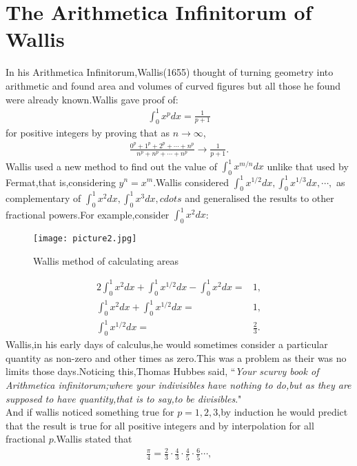 \documentclass[a4paper,reqno,11pt]{book}
\theoremstyle{plain}%
\theoremstyle{definition}
\begin{document}
\section{The Arithmetica Infinitorum of Wallis}
In his Arithmetica Infinitorum,Wallis(1655) thought of turning geometry into arithmetic and found area and volumes of curved figures but all those he found were already known.Wallis gave proof of:
\begin{eqnarray*}
    \int_{0}^{1}x^pdx=\frac{1}{p+1}
\end{eqnarray*}
for positive integers by proving that as $n\longrightarrow\infty$,
\begin{align*}
    \frac{0^p+1^p+2^p+\cdots+n^p}{n^p+n^p+\cdots+n^p}\longrightarrow\frac{1}{p+1}.
\end{align*}
Wallis used a new method to find out the value of $\int_{0}^{1}x^{m/n}dx$ unlike that used by Fermat,that is,considering $y^n=x^m$.Wallis considered $\int_{0}^{1}x^{1/2}dx,\int_{0}^{1}x^{1/3}dx,\cdots,$ as complementary of $\int_{0}^{1}x^2dx,\int_{0}^{1}x^3dx,cdots$ and generalised the results to other fractional powers.For example,consider $\int_{0}^{1}x^2dx$:
\begin{figure}[h]
    \centering
    \texttt{[image: picture2.jpg]}
    \caption{Wallis method of calculating areas}
    \label{fig:picture2}
\end{figure}
\begin{align*}
    2\int_{0}^{1}x^2dx+\int_{0}^{1}x^{1/2}dx-\int_{0}^{1}x^2dx=&1,\\
     \int_{0}^{1}x^2dx+\int_{0}^{1}x^{1/2}dx=&1,\\
     \int_{0}^{1}x^{1/2}dx=&\frac{2}{3}.
\end{align*}
Wallis,in his early days of calculus,he would sometimes consider a particular quantity as non-zero and other times as zero.This was a problem as their was no limits those days.Noticing this,Thomas Hubbes said, ``\textit{Your scurvy book of Arithmetica infinitorum;where
 your indivisibles have nothing to do,but as they are supposed to have
 quantity,that is to say,to be divisibles}."\cite{ref14}\\
\indent And if wallis noticed something true for $p=1,2,3$,by induction he would predict that the result is true for all positive integers and by interpolation for all fractional $p$.Wallis stated that
\begin{eqnarray*}
    \frac{\pi}{4}=\frac{2}{3}\cdot\frac{4}{3}\cdot\frac{4}{5}\cdot\frac{6}{5}\cdots,
\end{eqnarray*}
\end{document}
